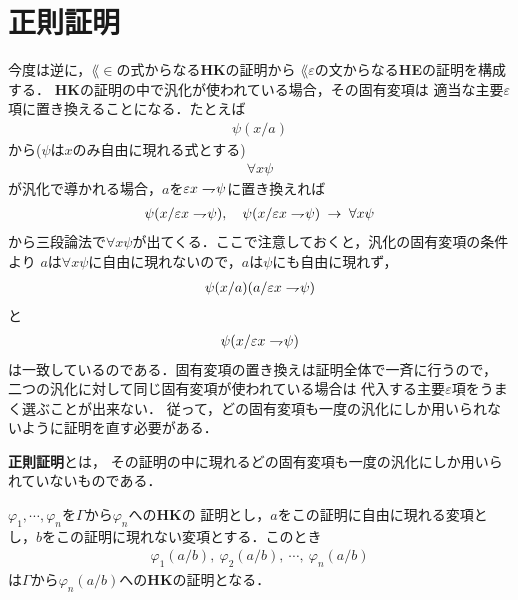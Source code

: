 \section{正則証明}
	今度は逆に，$\lang{\in}$の式からなる{\bf HK}の証明から
	$\lang{\varepsilon}$の文からなる{\bf HE}の証明を構成する．
	{\bf HK}の証明の中で汎化が使われている場合，その固有変項は
	適当な主要$\varepsilon$項に置き換えることになる．たとえば
	\begin{align}
		\psi(x/a)
	\end{align}
	から($\psi$は$x$のみ自由に現れる式とする)
	\begin{align}
		\forall x \psi
	\end{align}
	が汎化で導かれる場合，$a$を$\varepsilon x \rightharpoondown\hspace{-0.25em} \psi$に置き換えれば
	\begin{align}
		\psi(x/\varepsilon x \rightharpoondown\hspace{-0.25em} \psi), 
		\quad \psi(x/\varepsilon x \rightharpoondown\hspace{-0.25em} \psi) \hspace{0.25em}\rightarrow\hspace{0.25em} \forall x \psi
	\end{align}
	から三段論法で$\forall x \psi$が出てくる．ここで注意しておくと，汎化の固有変項の条件より
	$a$は$\forall x \psi$に自由に現れないので，$a$は$\psi$にも自由に現れず，
	\begin{align}
		\psi(x/a)(a/\varepsilon x \rightharpoondown\hspace{-0.25em} \psi)
	\end{align}
	と
	\begin{align}
		\psi(x/\varepsilon x \rightharpoondown\hspace{-0.25em} \psi)
	\end{align}
	は一致しているのである．固有変項の置き換えは証明全体で一斉に行うので，
	二つの汎化に対して同じ固有変項が使われている場合は
	代入する主要$\varepsilon$項をうまく選ぶことが出来ない．
	従って，どの固有変項も一度の汎化にしか用いられないように証明を直す必要がある．
	
	\begin{screen}
		\begin{metadfn}[正則証明]
			{\bf 正則証明}とは，
			その証明の中に現れるどの固有変項も一度の汎化にしか用いられていないものである．
		\end{metadfn}
	\end{screen}
	
	\begin{screen}
		\begin{metathm}[証明の変項は取り替えても可能]
			$\varphi_{1},\cdots,\varphi_{n}$を$\Gamma$から$\varphi_{n}$への{\bf HK}の
			証明とし，$a$をこの証明に自由に現れる変項とし，$b$をこの証明に現れない変項とする．このとき
			\begin{align}
				\varphi_{1}(a/b),\ \varphi_{2}(a/b),\ \cdots,\ \varphi_{n}(a/b)
			\end{align}
			は$\Gamma$から$\varphi_{n}(a/b)$への{\bf HK}の証明となる．
		\end{metathm}
	\end{screen}
	
